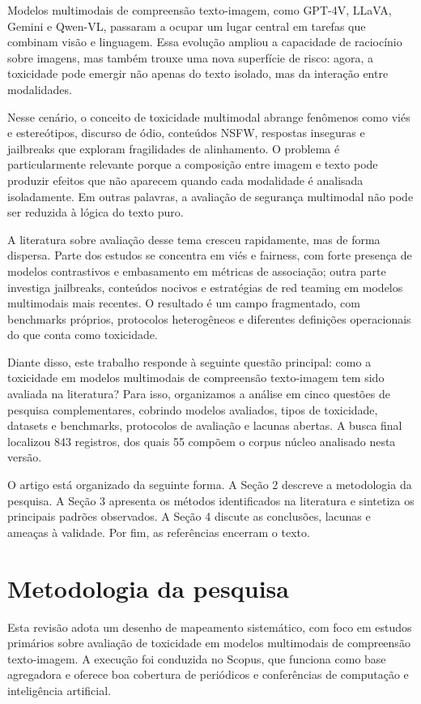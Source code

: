 \documentclass[12pt]{article}
\begin{document}
Modelos multimodais de compreensão texto-imagem, como GPT-4V, LLaVA, Gemini e Qwen-VL, passaram a ocupar um lugar central em tarefas que combinam visão e linguagem. Essa evolução ampliou a capacidade de raciocínio sobre imagens, mas também trouxe uma nova superfície de risco: agora, a toxicidade pode emergir não apenas do texto isolado, mas da interação entre modalidades.

Nesse cenário, o conceito de toxicidade multimodal abrange fenômenos como viés e estereótipos, discurso de ódio, conteúdos NSFW, respostas inseguras e jailbreaks que exploram fragilidades de alinhamento. O problema é particularmente relevante porque a composição entre imagem e texto pode produzir efeitos que não aparecem quando cada modalidade é analisada isoladamente. Em outras palavras, a avaliação de segurança multimodal não pode ser reduzida à lógica do texto puro.

A literatura sobre avaliação desse tema cresceu rapidamente, mas de forma dispersa. Parte dos estudos se concentra em viés e fairness, com forte presença de modelos contrastivos e embasamento em métricas de associação; outra parte investiga jailbreaks, conteúdos nocivos e estratégias de red teaming em modelos multimodais mais recentes. O resultado é um campo fragmentado, com benchmarks próprios, protocolos heterogêneos e diferentes definições operacionais do que conta como toxicidade.

Diante disso, este trabalho responde à seguinte questão principal: como a toxicidade em modelos multimodais de compreensão texto-imagem tem sido avaliada na literatura? Para isso, organizamos a análise em cinco questões de pesquisa complementares, cobrindo modelos avaliados, tipos de toxicidade, datasets e benchmarks, protocolos de avaliação e lacunas abertas. A busca final localizou 843 registros, dos quais 55 compõem o corpus núcleo analisado nesta versão.

O artigo está organizado da seguinte forma. A Seção 2 descreve a metodologia da pesquisa. A Seção 3 apresenta os métodos identificados na literatura e sintetiza os principais padrões observados. A Seção 4 discute as conclusões, lacunas e ameaças à validade. Por fim, as referências encerram o texto.

\section{Metodologia da pesquisa}

Esta revisão adota um desenho de mapeamento sistemático, com foco em estudos primários sobre avaliação de toxicidade em modelos multimodais de compreensão texto-imagem. A execução foi conduzida no Scopus, que funciona como base agregadora e oferece boa cobertura de periódicos e conferências de computação e inteligência artificial.
\end{document}
